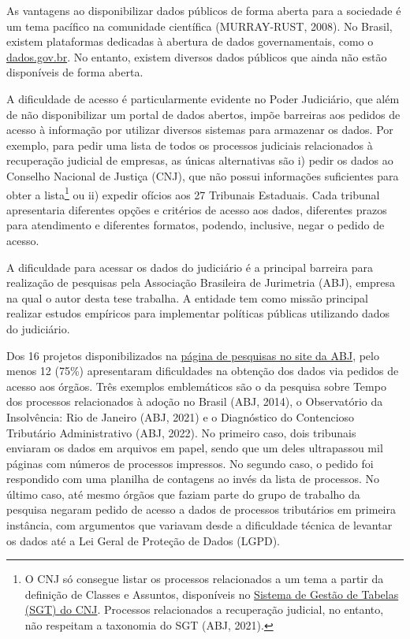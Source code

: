\documentclass[12pt,twoside,brazilian]{book}
\begin{document}
As vantagens ao disponibilizar dados públicos de forma aberta para a
sociedade é um tema pacífico na comunidade científica (MURRAY-RUST,
2008). No Brasil, existem plataformas dedicadas à abertura de dados
governamentais, como o \href{https://dados.gov.br}{dados.gov.br}. No
entanto, existem diversos dados públicos que ainda não estão disponíveis
de forma aberta.

A dificuldade de acesso é particularmente evidente no Poder Judiciário,
que além de não disponibilizar um portal de dados abertos, impõe
barreiras aos pedidos de acesso à informação por utilizar diversos
sistemas para armazenar os dados. Por exemplo, para pedir uma lista de
todos os processos judiciais relacionados à recuperação judicial de
empresas, as únicas alternativas são i) pedir os dados ao Conselho
Nacional de Justiça (CNJ), que não possui informações suficientes para
obter a lista\footnote{O CNJ só consegue listar os processos
  relacionados a um tema a partir da definição de Classes e Assuntos,
  disponíveis no
  \href{https://www.cnj.jus.br/sgt/consulta_publica_classes.php}{Sistema
  de Gestão de Tabelas (SGT) do CNJ}. Processos relacionados a
  recuperação judicial, no entanto, não respeitam a taxonomia do SGT
  (ABJ, 2021).} ou ii) expedir ofícios aos 27 Tribunais Estaduais. Cada
tribunal apresentaria diferentes opções e critérios de acesso aos dados,
diferentes prazos para atendimento e diferentes formatos, podendo,
inclusive, negar o pedido de acesso.

A dificuldade para acessar os dados do judiciário é a principal barreira
para realização de pesquisas pela Associação Brasileira de Jurimetria
(ABJ), empresa na qual o autor desta tese trabalha. A entidade tem como
missão principal realizar estudos empíricos para implementar políticas
públicas utilizando dados do judiciário.

Dos 16 projetos disponibilizados na
\href{https://abj.org.br/pesquisas/}{página de pesquisas no site da
ABJ}, pelo menos 12 (75\%) apresentaram dificuldades na obtenção dos
dados via pedidos de acesso aos órgãos. Três exemplos emblemáticos são o
da pesquisa sobre Tempo dos processos relacionados à adoção no Brasil
(ABJ, 2014), o Observatório da Insolvência: Rio de Janeiro (ABJ, 2021) e
o Diagnóstico do Contencioso Tributário Administrativo (ABJ, 2022). No
primeiro caso, dois tribunais enviaram os dados em arquivos em papel,
sendo que um deles ultrapassou mil páginas com números de processos
impressos. No segundo caso, o pedido foi respondido com uma planilha de
contagens ao invés da lista de processos. No último caso, até mesmo
órgãos que faziam parte do grupo de trabalho da pesquisa negaram pedido
de acesso a dados de processos tributários em primeira instância, com
argumentos que variavam desde a dificuldade técnica de levantar os dados
até a Lei Geral de Proteção de Dados (LGPD).
\end{document}
